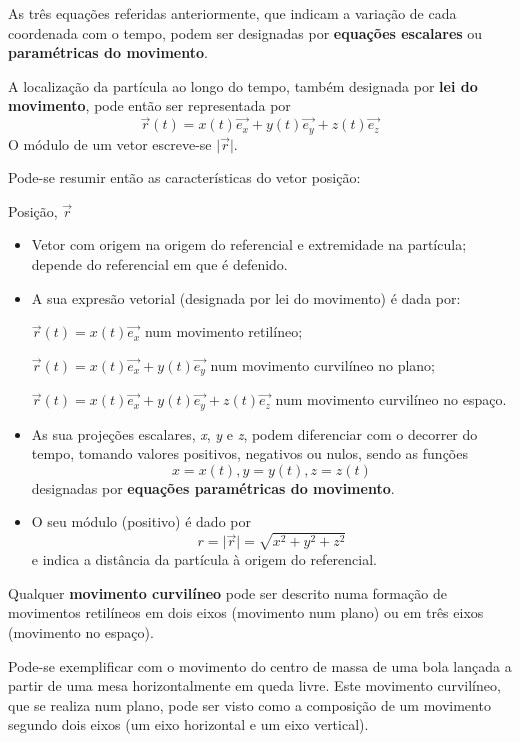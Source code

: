 \documentclass[a4paper,11pt,oneside]{report}
\begin{document}
As três equações referidas anteriormente, que indicam a variação de cada coordenada com o tempo,
podem ser designadas por \textbf{equações escalares} ou \textbf{paramétricas do movimento}.

A localização da partícula ao longo do tempo, também designada por \textbf{lei do movimento},
pode então ser representada por 
\[
\vec{r}(t) = x(t)\vec{e_x} + y(t)\vec{e_y} + z(t)\vec{e_z}
\]
O módulo de um vetor escreve-se \(| \vec{r}\vert \).

Pode-se resumir então as características do vetor posição:

\hrulefill
\begin{center}
    Posição, \(\vec{r}\)
\end{center}
\begin{itemize}
    \item Vetor com origem na origem do referencial e extremidade na partícula; depende do referencial em que é defenido.
    \item A sua expresão vetorial (designada por lei do movimento) é dada por:
   
     \(\vec{r}(t) = x(t)\vec{e_x}\) num movimento retilíneo;

     \(\vec{r}(t) = x(t)\vec{e_x} + y(t)\vec{e_y}\) num movimento curvilíneo no plano;

     \(\vec{r}(t) = x(t)\vec{e_x} + y(t)\vec{e_y} + z(t)\vec{e_z}\) num movimento curvilíneo no espaço.
    \item As sua projeções escalares, \textit{x}, \textit{y} e \textit{z}, podem diferenciar com o decorrer do tempo,
    tomando valores positivos, negativos ou nulos, sendo as funções
     \[
     x = x(t), y = y(t), z = z(t)
     \]
     designadas por \textbf{equações paramétricas do movimento}.
    \item O seu módulo (positivo) é dado por 
     \[
     r = | \vec{r}\vert = \sqrt{x^2 + y^2 + z^2}
     \]
     e indica a distância da partícula à origem do referencial.
\end{itemize}
\hrulefill

Qualquer \textbf{movimento curvilíneo} pode ser descrito numa formação 
de movimentos retilíneos em dois eixos (movimento num plano) ou em três eixos (movimento
no espaço).

Pode-se exemplificar com o movimento do centro de massa de uma bola lançada a partir de uma mesa horizontalmente
em queda livre. Este movimento curvilíneo, que se realiza num plano, pode ser visto
como a composição de um movimento segundo dois eixos (um eixo horizontal e um eixo vertical).
\end{document}
